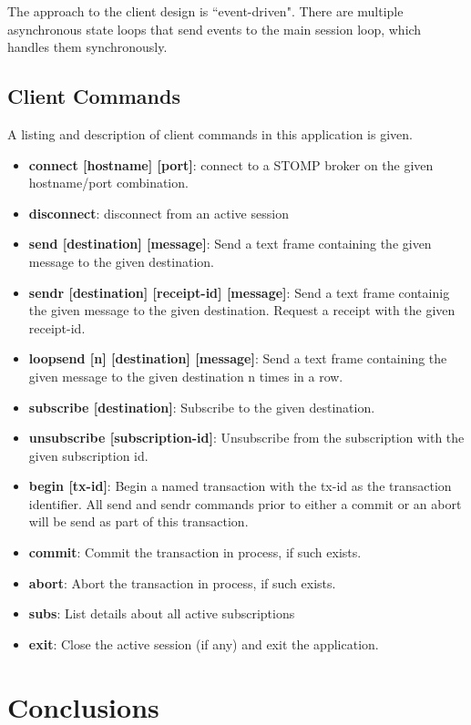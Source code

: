 \documentclass[conference, letterpaper]{IEEEtran}
\begin{document}
The approach to the client design is ``event-driven". There are multiple asynchronous state loops that send events to the main session loop, which handles them synchronously.

\subsection{Client Commands}

A listing and description of client commands in this application is given.

\begin{itemize}
    \item \textbf{connect [hostname] [port]}: connect to a STOMP broker on the given hostname/port combination.
    \item \textbf{disconnect}: disconnect from an active session
    \item \textbf{send [destination] [message]}: Send a text frame containing the given message to the given destination.
    \item \textbf{sendr [destination] [receipt-id] [message]}: Send a text frame containig the given message to the given destination. Request a receipt with the given receipt-id.
    \item \textbf{loopsend [n] [destination] [message]}: Send a text frame containing the given message to the given destination n times in a row.
    \item \textbf{subscribe [destination]}: Subscribe to the given destination.
    \item \textbf{unsubscribe [subscription-id]}: Unsubscribe from the subscription with the given subscription id.
    \item \textbf{begin [tx-id]}: Begin a named transaction with the tx-id as the transaction identifier. All send and sendr commands prior to either a commit or an abort will be send as part of this transaction.
    \item \textbf{commit}: Commit the transaction in process, if such exists.
    \item \textbf{abort}: Abort the transaction in process, if such exists.
    \item \textbf{subs}: List details about all active subscriptions
    \item \textbf{exit}: Close the active session (if any) and exit the application.
\end{itemize}
\section{Conclusions}
\end{document}
